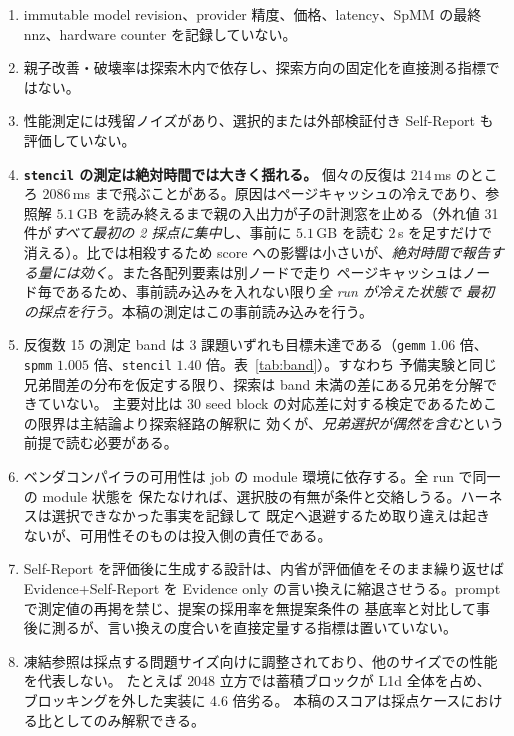 \documentclass[conference,letterpaper]{IEEEtran}
\newcommand{\armE}{Evidence only}
\newcommand{\armS}{Evidence+Self-Report}
\begin{document}
\begin{enumerate}
    $N=5,20$、expert-tuned baseline、実アプリケーションは新しい実験を要し、既存 trace から復元できない。
  \item immutable model revision、provider 精度、価格、latency、SpMM の最終 nnz、hardware counter を記録していない。
  \item 親子改善・破壊率は探索木内で依存し、探索方向の固定化を直接測る指標ではない。
  \item 性能測定には残留ノイズがあり、選択的または外部検証付き Self-Report も評価していない。
  \item \textbf{\texttt{stencil} の測定は絶対時間では大きく揺れる。} 個々の反復は
    $214$\,ms のところ $2086$\,ms まで飛ぶことがある。原因はページキャッシュの冷えであり、参照解
    $5.1$\,GB を読み終えるまで親の入出力が子の計測窓を止める（外れ値 31 件が\emph{すべて最初の
    2 採点に集中}し、事前に $5.1$\,GB を読む $2$\,s を足すだけで消える）。比では相殺するため score
    への影響は小さいが、\emph{絶対時間で報告する量には効く}。また各配列要素は別ノードで走り
    ページキャッシュはノード毎であるため、事前読み込みを入れない限り\emph{全 run が冷えた状態で
    最初の採点を行う}。本稿の測定はこの事前読み込みを行う。
  \item 反復数 15 の測定 band は 3 課題いずれも目標未達である（\texttt{gemm} $1.06$ 倍、
    \texttt{spmm} $1.005$ 倍、\texttt{stencil} $1.40$ 倍。表~\ref{tab:band}）。すなわち
    予備実験と同じ兄弟間差の分布を仮定する限り、探索は band 未満の差にある兄弟を分解できていない。
    主要対比は 30 seed block の対応差に対する検定であるためこの限界は主結論より探索経路の解釈に
    効くが、\emph{兄弟選択が偶然を含む}という前提で読む必要がある。
  \item ベンダコンパイラの可用性は job の module 環境に依存する。全 run で同一の module 状態を
    保たなければ、選択肢の有無が条件と交絡しうる。ハーネスは選択できなかった事実を記録して
    既定へ退避するため取り違えは起きないが、可用性そのものは投入側の責任である。
  \item Self-Report を評価後に生成する設計は、内省が評価値をそのまま繰り返せば \armS{} を
    \armE{} の言い換えに縮退させうる。prompt で測定値の再掲を禁じ、提案の採用率を無提案条件の
    基底率と対比して事後に測るが、言い換えの度合いを直接定量する指標は置いていない。
  \item 凍結参照は採点する問題サイズ向けに調整されており、他のサイズでの性能を代表しない。
    たとえば $2048$ 立方では蓄積ブロックが L1d 全体を占め、ブロッキングを外した実装に 4.6 倍劣る。
    本稿のスコアは採点ケースにおける比としてのみ解釈できる。
\end{enumerate}
\end{document}
